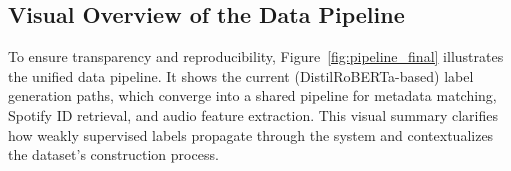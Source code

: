 \documentclass{article}
\begin{document}



\subsection{Visual Overview of the Data Pipeline}

To ensure transparency and reproducibility, Figure~\ref{fig:pipeline_final} illustrates the unified data pipeline. It shows the current (DistilRoBERTa-based) label generation paths, which converge into a shared pipeline for metadata matching, Spotify ID retrieval, and audio feature extraction. This visual summary clarifies how weakly supervised labels propagate through the system and contextualizes the dataset's construction process.
\end{document}

